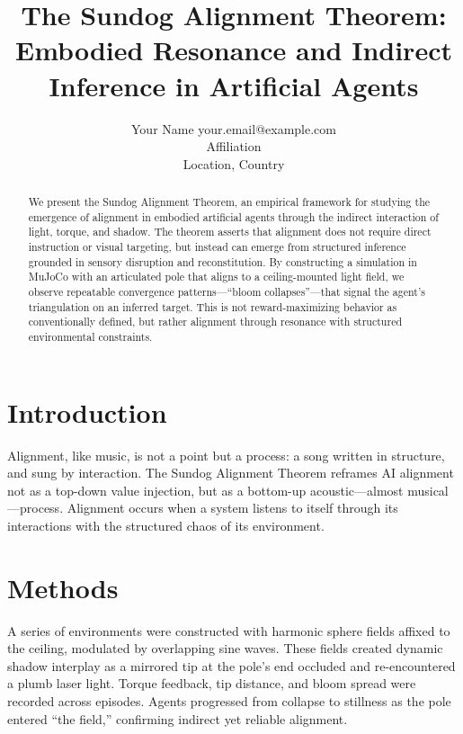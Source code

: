 \documentclass[11pt]{article}
\begin{document}
\title{The Sundog Alignment Theorem: Embodied Resonance and Indirect Inference in Artificial Agents}

\author{\name Your Name \email your.email@example.com \\
       \addr Affiliation \\
       Location, Country}

\maketitle

\begin{abstract}
We present the Sundog Alignment Theorem, an empirical framework for studying the emergence of alignment in embodied artificial agents through the indirect interaction of light, torque, and shadow. The theorem asserts that alignment does not require direct instruction or visual targeting, but instead can emerge from structured inference grounded in sensory disruption and reconstitution. By constructing a simulation in MuJoCo with an articulated pole that aligns to a ceiling-mounted light field, we observe repeatable convergence patterns—``bloom collapses''—that signal the agent's triangulation on an inferred target. This is not reward-maximizing behavior as conventionally defined, but rather alignment through resonance with structured environmental constraints.
\end{abstract}

\section{Introduction}
Alignment, like music, is not a point but a process: a song written in structure, and sung by interaction. The Sundog Alignment Theorem reframes AI alignment not as a top-down value injection, but as a bottom-up acoustic—almost musical—process. Alignment occurs when a system listens to itself through its interactions with the structured chaos of its environment.

\section{Methods}
A series of environments were constructed with harmonic sphere fields affixed to the ceiling, modulated by overlapping sine waves. These fields created dynamic shadow interplay as a mirrored tip at the pole's end occluded and re-encountered a plumb laser light. Torque feedback, tip distance, and bloom spread were recorded across episodes. Agents progressed from collapse to stillness as the pole entered ``the field,'' confirming indirect yet reliable alignment.
\end{document}
